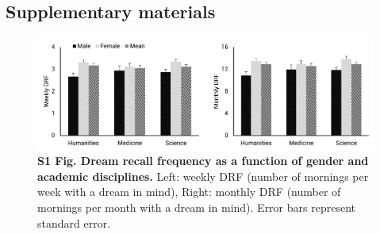 \subsection*{Supplementary materials}
\label{res:survey:supp}
\vspace*{1cm}

\begin{figure}[htb]
	\includegraphics[width=\textwidth]{Fig/Results/Survey/S1_Fig.png}
	\caption*{\textbf{S1 Fig. Dream recall frequency as a function of gender and academic disciplines.} Left: weekly DRF (number of mornings per week with a dream in mind), Right: monthly DRF (number of mornings per month with a dream in mind). Error bars represent standard error.}
\end{figure}
